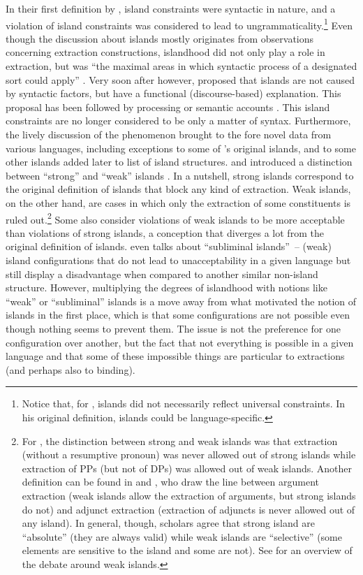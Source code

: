 In their first definition by \citeauthor{Ross.1967}, island constraints were syntactic in nature, and a violation of island constraints was considered to lead to ungrammaticality.\footnote{Notice that, for \citet{Ross.1967}, islands did not necessarily reflect universal constraints. In his original definition, islands could be language-specific.} Even though the discussion about islands mostly originates from observations concerning extraction constructions, islandhood did not only play a role in extraction, but was ``the maximal areas in which syntactic process of a designated sort could apply'' \citep[258]{Ross.1987}. Very soon after however, \citet{Erteschik-Shir.1973} proposed that islands are not caused by syntactic factors, but have a functional (discourse-based) explanation. This proposal has been followed by processing \citep{Kluender.1998} or semantic accounts \citep{Szabolcsi.1990}. This island constraints are no longer considered to be only a matter of syntax. Furthermore, the lively discussion of the phenomenon brought to the fore novel data from various languages, including exceptions to some of \citeauthor{Ross.1967}'s original islands, and to some other islands added later to list of island structures. \citet{Cinque.1990} and \citet{Rizzi.1990} introduced a distinction between ``strong'' and ``weak'' islands \citep{Kluender.1998,Szabolcsi.2006}. In a nutshell, strong islands correspond to the original definition of islands that block any kind of extraction. Weak islands, on the other hand, are cases in which only the extraction of some constituents is ruled out.\footnote{For \citet{Cinque.1990}, the distinction between strong and weak islands was that extraction (without a resumptive pronoun) was never allowed out of strong islands while extraction of PPs (but not of DPs) was allowed out of weak islands. Another definition can be found in \citet{Huang.1982} and \citet{Chomsky.1986}, who draw the line between argument extraction (weak islands allow the extraction of arguments, but strong islands do not) and adjunct extraction (extraction of adjuncts is never allowed out of any island). In general, though, scholars agree that strong island are ``absolute'' (they are always valid) while weak islands are ``selective'' (some elements are sensitive to the island and some are not). See \citet{Szabolcsi.2006} for an overview of the debate around weak islands.} Some also consider violations of weak islands to be more acceptable than violations of strong islands, a conception that diverges a lot from the original definition of islands. \citet{Almeida.2014} even talks about ``subliminal islands''~-- (weak) island configurations that do not lead to unacceptability in a given language but still display a disadvantage when compared to another similar non-island structure. However, multiplying the degrees of islandhood with notions like ``weak'' or ``subliminal'' islands is a move away from what motivated the notion of islands in the first place, which is that some configurations are not possible even though nothing seems to prevent them. The issue is not the preference for one configuration over another, but the fact that not everything is possible in a given language and that some of these impossible things are particular to extractions (and perhaps also to binding).

